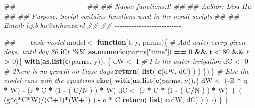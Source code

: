 \documentclass[
]{article}
\newenvironment{Shaded}{\begin{snugshade}}{\end{snugshade}}
\newcommand{\CommentTok}[1]{\textcolor[rgb]{0.56,0.35,0.01}{\textit{#1}}}
\newcommand{\ControlFlowTok}[1]{\textcolor[rgb]{0.13,0.29,0.53}{\textbf{#1}}}
\newcommand{\DecValTok}[1]{\textcolor[rgb]{0.00,0.00,0.81}{#1}}
\newcommand{\KeywordTok}[1]{\textcolor[rgb]{0.13,0.29,0.53}{\textbf{#1}}}
\newcommand{\NormalTok}[1]{#1}
\newcommand{\OperatorTok}[1]{\textcolor[rgb]{0.81,0.36,0.00}{\textbf{#1}}}
\newcommand{\StringTok}[1]{\textcolor[rgb]{0.31,0.60,0.02}{#1}}
\begin{document}
\begin{Shaded}
\begin{Highlighting}[numbers=left,,]
\CommentTok{\#\# {-}{-}{-}{-}{-}{-}{-}{-}{-}{-}{-}{-}{-}{-}{-}{-}{-}{-}{-}{-}{-}{-}{-}{-}{-}{-}{-}}
\CommentTok{\#\#}
\CommentTok{\#\# Name: functions.R}
\CommentTok{\#\#}
\CommentTok{\#\# Author: Lisa Hu}
\CommentTok{\#\#}
\CommentTok{\#\# Purpose: Script contains functions used in the result scripts}
\CommentTok{\#\#}
\CommentTok{\#\# Email: l.j.b.hu@st.hanze.nl}
\CommentTok{\#\#}
\CommentTok{\#\# {-}{-}{-}{-}{-}{-}{-}{-}{-}{-}{-}{-}{-}{-}{-}{-}{-}{-}{-}{-}{-}{-}{-}{-}{-}{-}{-}}

\CommentTok{\#\# {-}{-}{-}{-} basic{-}model}
\NormalTok{model \textless{}{-}}\StringTok{ }\ControlFlowTok{function}\NormalTok{(t, y, parms)\{}
  \CommentTok{\# Add water every given days, until day 80}
  \ControlFlowTok{if}\NormalTok{(t }\OperatorTok{\%\%}\StringTok{ }\KeywordTok{as.numeric}\NormalTok{(parms[}\StringTok{"time"}\NormalTok{]) }\OperatorTok{==}\StringTok{ }\DecValTok{0} \OperatorTok{\&\&}\StringTok{ }\NormalTok{t }\OperatorTok{\textless{}}\StringTok{ }\DecValTok{80} \OperatorTok{\&\&}\StringTok{ }\NormalTok{t }\OperatorTok{\textgreater{}}\StringTok{ }\DecValTok{0}\NormalTok{)\{}
    \KeywordTok{with}\NormalTok{(}\KeywordTok{as.list}\NormalTok{(}\KeywordTok{c}\NormalTok{(parms, y)), \{}
\NormalTok{      dW \textless{}{-}}\StringTok{ }\NormalTok{I }\CommentTok{\# I is the water irrigation}
\NormalTok{      dC \textless{}{-}}\StringTok{ }\DecValTok{0} \CommentTok{\# There is no growth on those days}
      \KeywordTok{return}\NormalTok{( }\KeywordTok{list}\NormalTok{( }\KeywordTok{c}\NormalTok{(dW, dC) ) )}
\NormalTok{    \})}
\NormalTok{  \}}
  \CommentTok{\# Else the model runs with the equations}
  \ControlFlowTok{else}\NormalTok{\{}
    \KeywordTok{with}\NormalTok{(}\KeywordTok{as.list}\NormalTok{(}\KeywordTok{c}\NormalTok{(parms, y)),\{}
\NormalTok{      dW \textless{}{-}}\StringTok{ }\NormalTok{(}\OperatorTok{{-}}\NormalTok{B }\OperatorTok{*}\StringTok{ }\NormalTok{q }\OperatorTok{*}\StringTok{ }\NormalTok{W) }\OperatorTok{{-}}\StringTok{ }\NormalTok{(r }\OperatorTok{*}\StringTok{ }\NormalTok{C }\OperatorTok{*}\StringTok{ }\NormalTok{(}\DecValTok{1} \OperatorTok{{-}}\StringTok{ }\NormalTok{( C}\OperatorTok{/}\NormalTok{N ) ) }\OperatorTok{*}\StringTok{ }\NormalTok{W)}
\NormalTok{      dC \textless{}{-}}\StringTok{ }\NormalTok{(r }\OperatorTok{*}\StringTok{ }\NormalTok{C }\OperatorTok{*}\StringTok{ }\NormalTok{(}\DecValTok{1} \OperatorTok{{-}}\StringTok{ }\NormalTok{( C}\OperatorTok{/}\NormalTok{N ) ) }\OperatorTok{*}\StringTok{ }\NormalTok{W) }\OperatorTok{+}\StringTok{ }\NormalTok{( (g}\OperatorTok{*}\NormalTok{q}\OperatorTok{*}\NormalTok{C}\OperatorTok{*}\NormalTok{W)}\OperatorTok{/}\NormalTok{(C}\OperatorTok{+}\DecValTok{1}\NormalTok{)}\OperatorTok{*}\NormalTok{(W}\OperatorTok{+}\DecValTok{1}\NormalTok{) ) }\OperatorTok{{-}}\StringTok{ }\NormalTok{o }\OperatorTok{*}\StringTok{ }\NormalTok{C}
      \KeywordTok{return}\NormalTok{( }\KeywordTok{list}\NormalTok{( }\KeywordTok{c}\NormalTok{(dW, dC) ) )}
\NormalTok{    \})}
\NormalTok{  \}}
\NormalTok{\}}


\end{Highlighting}
\end{Shaded}
\end{document}
